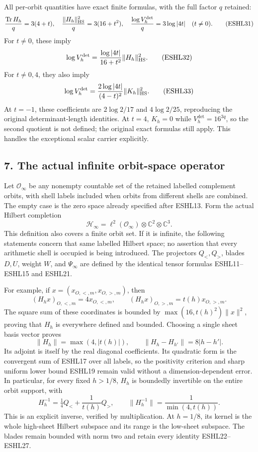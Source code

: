 \documentclass[
  10pt,
  a4paper,
]{article}
\newcounter{none} %
\begin{document}
All per-orbit quantities have exact finite formulas, with the full
factor \(q\) retained: \[
\frac{\operatorname{Tr}H_h}{q}=3(4+t),\quad
\frac{\|H_h\|_{\rm HS}^2}{q}=3(16+t^2),\quad
\frac{\log V_h^{\det}}q=3\log|4t|\quad(t\ne0).
\tag{ESHL31}
\] For \(t\ne0\), these imply \[
\log V_h^{\det}
=\frac{\log|4t|}{16+t^2}\|H_h\|_{\rm HS}^2.
\tag{ESHL32}
\] For \(t\ne0,4\), they also imply \[
\log V_h^{\det}
=\frac{2\log|4t|}{(4-t)^2}\|K_h\|_{\rm HS}^2.
\tag{ESHL33}
\] At \(t=-1\), these coefficients are \(2\log2/17\) and \(4\log2/25\),
reproducing the original determinant-length identities. At \(t=4\),
\(K_h=0\) while \(V_h^{\det}=16^{3q}\), so the second quotient is not
defined; the original exact formulas still apply. This handles the
exceptional scalar carrier explicitly.

\subsection{7. The actual infinite orbit-space
operator}\label{the-actual-infinite-orbit-space-operator}

Let \(\mathcal O_\infty\) be any nonempty countable set of the retained
labelled complement orbits, with shell labels included when orbits from
different shells are combined. The empty case is the zero space already
specified after ESHL13. Form the actual Hilbert completion \[
\mathcal H_\infty=\ell^2(\mathcal O_\infty)\otimes\mathbb C^2\otimes\mathbb C^3.
\tag{ESHL34}
\] This definition also covers a finite orbit set. If it is infinite,
the following statements concern that same labelled Hilbert space; no
assertion that every arithmetic shell is occupied is being introduced.
The projectors \(Q_<,Q_>\), blades \(D,U\), weight \(W\), and
\(\Psi_\infty\) are defined by the identical tensor formulas
ESHL11--ESHL15 and ESHL21.

For example, if \(x=(x_{O,<,m},x_{O,>,m})\), then \[
(H_hx)_{O,<,m}=4x_{O,<,m},\qquad
(H_hx)_{O,>,m}=t(h)x_{O,>,m}.
\tag{ESHL35}
\] The square sum of these coordinates is bounded by
\(\max(16,t(h)^2)\|x\|^2\), proving that \(H_h\) is everywhere defined
and bounded. Choosing a single sheet basis vector proves \[
\|H_h\|=\max(4,|t(h)|),\qquad
\|H_h-H_{h'}\|=8|h-h'|.
\tag{ESHL36}
\] Its adjoint is itself by the real diagonal coefficients. Its
quadratic form is the convergent sum of ESHL17 over all labels, so the
positivity criterion and sharp uniform lower bound ESHL19 remain valid
without a dimension-dependent error. In particular, for every fixed
\(h>1/8\), \(H_h\) is boundedly invertible on the entire orbit support,
with \[
H_h^{-1}=\tfrac14Q_<+\frac1{t(h)}Q_>,
\qquad\|H_h^{-1}\|=\frac1{\min(4,t(h))}.
\tag{ESHL37}
\] This is an explicit inverse, verified by multiplication. At
\(h=1/8\), its kernel is the whole high-sheet Hilbert subspace and its
range is the low-sheet subspace. The blades remain bounded with norm two
and retain every identity ESHL22--ESHL27.
\end{document}

